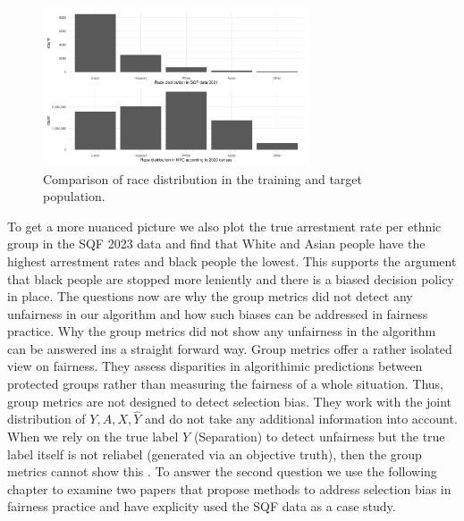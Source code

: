 \begin{figure}
    \centering
    \includegraphics[width=0.7\textwidth]{../figures/sqf_case_study_plot6.png}
    \caption{Comparison of race distribution in the training and target population.}
    \label{fig:race_distributions}
\end{figure}

To get a more nuanced picture we also plot the true arrestment rate per ethnic group in the SQF 2023 data and find that White and Asian people have the highest arrestment rates and black people the lowest. This supports the argument that black people are stopped more leniently and there is a biased decision policy in place. The questions now are why the group metrics did not detect any unfairness in our algorithm and how such biases can be addressed in fairness practice.
Why the group metrics did not show any unfairness in the algorithm can be answered ins a straight forward way. Group metrics offer a rather isolated view on fairness. They assess disparities in algorithimic predictions between protected groups rather than measuring the fairness of a whole situation. Thus, group metrics are not designed to detect selection bias. They work with the joint distribution of $Y, A, X, \hat{Y}$ and do not take any additional information into account. When we rely on the true label $Y$ (Separation) to detect unfairness but the true label itself is not reliabel (generated via an objective truth), then the group metrics cannot show this \cite{castelnovo2022}.
To answer the second question we use the following chapter to examine two papers that propose methods to address selection bias in fairness practice and have explicity used the SQF data as a case study.

